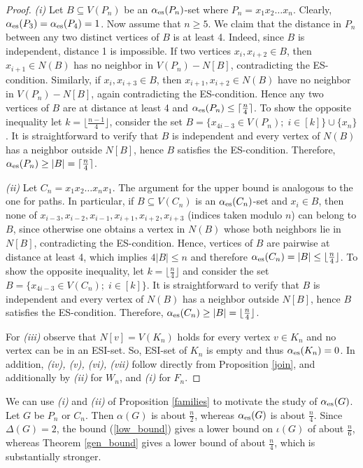 \documentclass[11pt]{article}
\newcommand{\io}{\iota}
\newcommand{\es}{\alpha_{\rm es}}
\newcommand{\al}{\alpha}
\begin{document}
\begin{proof}
\textit{(i)} Let $B\subseteq V(P_n)$ be an $\es(P_n)$-set where $P_n=x_1x_2\ldots x_n$. Clearly, $\es(P_3)=\es(P_4)=1$. Now assume that $n\geq 5$. We claim that the distance in $P_n$ between any two distinct vertices of $B$ is at least 4. Indeed, since $B$ is independent, distance 1 is impossible. If two vertices $x_i, x_{i+2}\in B$, then $x_{i+1}\in N(B)$ has no neighbor in $V(P_n)-N[B]$, contradicting the ES-condition. Similarly, if $x_i, x_{i+3}\in B$, then $x_{i+1},x_{i+2}\in N(B)$ have no neighbor in $V(P_n)-N[B]$, again contradicting the ES-condition. Hence any two vertices of $B$ are at distance at least 4 and $\es(P_n)\le \lceil \frac n4 \rceil$. To show the opposite inequality let $k=\lfloor \frac{n-1}{4} \rfloor$, consider the set $B=\{x_{4i-3}\in V(P_n); \; i\in [k]\}\cup\{x_n\}$. It is straightforward to verify that $B$ is independent and every vertex of $N(B)$ has a neighbor outside $N[B]$, hence $B$ satisfies the ES-condition. Therefore, $\es(P_n)\geq|B|=\lceil \frac n4 \rceil$.

\medskip 
\textit{(ii)} Let $C_n=x_1x_2\ldots x_n x_1$. The argument for the upper bound is analogous to the one for paths. In particular, if $B\subseteq V(C_n)$ is an $\es(C_n)$-set and $x_i\in B$, then none of $x_{i-3},x_{i-2},x_{i-1},x_{i+1},x_{i+2},x_{i+3}$ (indices taken modulo $n$) can belong to $B$, since otherwise one obtains a vertex in $N(B)$ whose both neighbors lie in $N[B]$, contradicting the ES-condition. Hence, vertices of $B$ are pairwise at distance at least 4, which implies $4|B|\leq n$ and therefore $\es(C_n)=|B|\leq \lfloor \frac n4 \rfloor$. To show the opposite inequality, let $k=\lfloor \frac n4 \rfloor$ and consider the set $B=\{x_{4i-3}\in V(C_n); \; i\in [k]\}$. It is straightforward to verify that $B$ is independent and every vertex of $N(B)$ has a neighbor outside $N[B]$, hence $B$ satisfies the ES-condition. Therefore, $\es(C_n)\geq|B|=\lfloor \frac n4 \rfloor$.

\medskip
For \textit{(iii)} observe that $N[v]=V(K_n)$ holds for every vertex $v\in K_n$ and no vertex can be in an ESI-set. So, ESI-set of $K_n$ is empty and thus $\es(K_n)=0$. In addition, \textit{(iv), (v), (vi), (vii)} follow directly from Proposition \ref{join}, and additionally by \textit{(ii)} for $W_n$, and \textit{(i)} for $F_n$.
\end{proof}

We can use \textit{(i)} and \textit{(ii)} of Proposition \ref{families} to motivate the study of $\es(G)$. Let $G$ be $P_n$ or $C_n$. Then $\al(G)$ is about $\frac{n}{2}$, whereas $\es(G)$ is about $\frac{n}{4}$. Since $\Delta(G)=2$, 
the bound (\ref{low_bound}) gives a lower bound 
on $\io(G)$ of about $\frac{n}{6}$, whereas Theorem \ref{gen_bound} gives a lower bound of about $\frac{n}{4}$, which is substantially stronger.
\end{document}
